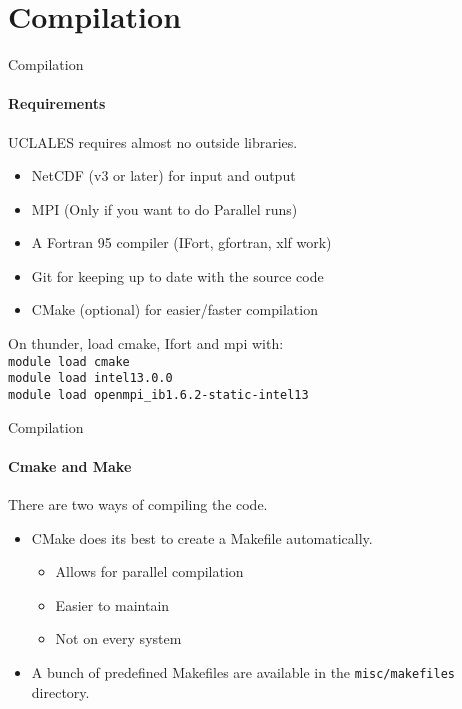 \documentclass[handout]{beamer}
\newcommand{\code}[1]{{\tt #1}}
\begin{document}
\section{Compilation}
\begin{frame}[<+->]{Compilation}
\framesubtitle{Requirements}
UCLALES requires almost no outside libraries.
 \begin{itemize}
  \item NetCDF (v3 or later) for input and output 
  \item MPI (Only if you want to do Parallel runs)
  \item A Fortran 95 compiler (IFort, gfortran, xlf work)
  \item Git for keeping up to date with the source code
  \item CMake (optional) for easier/faster compilation
 \end{itemize}
On thunder, load cmake, Ifort and mpi with:\\
\code{module load cmake \\ module load intel\/13.0.0 \\ module load openmpi\_ib\/1.6.2-static-intel13}
\end{frame}
\begin{frame}[<+->]{Compilation}
\framesubtitle{Cmake and Make}
There are two ways of compiling the code.
\begin{itemize}
 \item CMake does its best to create a Makefile automatically. 
\begin{itemize}
 \item Allows for parallel compilation
 \item Easier to maintain
 \item Not on every system
\end{itemize}
 \item A bunch of predefined Makefiles are available in the \code{misc/makefiles} directory.
\end{itemize}
\end{frame}
\end{document}
